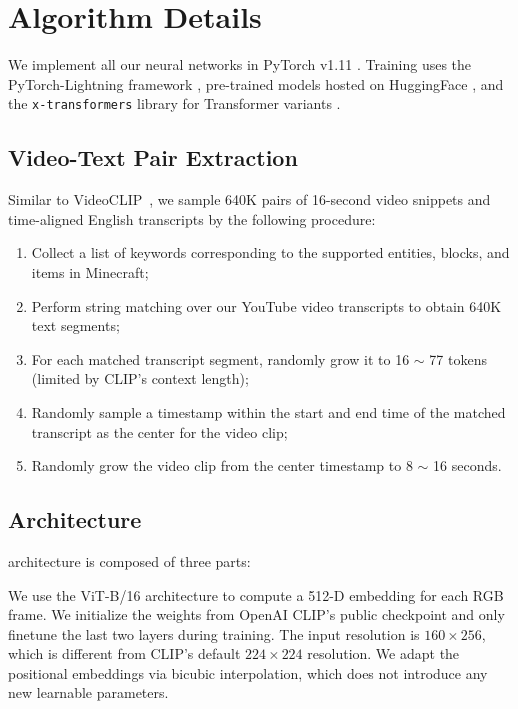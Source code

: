 \section{\mineclip Algorithm Details}
\label{supp:sec:mineclip}

We implement all our neural networks in PyTorch v1.11 \cite{paszke2019pytorch}. Training \mineclip uses the PyTorch-Lightning framework \cite{falcon2019pytorchlightning}, pre-trained models hosted on HuggingFace \cite{wolf2019huggingfaces}, and the \texttt{x-transformers} library for Transformer variants \cite{wang2021xtransformers}.

\subsection{Video-Text Pair Extraction}

Similar to VideoCLIP~\cite{xu2021videoclip}, we sample 640K pairs of 16-second video snippets and time-aligned English transcripts by the following procedure:

\begin{enumerate}[label=\arabic*)]
    \item Collect a list of keywords corresponding to the supported entities, blocks, and items in Minecraft;
    \item Perform string matching over our YouTube video transcripts to obtain 640K text segments;
    \item For each matched transcript segment, randomly grow it to 16 $\sim$ 77 tokens (limited by CLIP's context length);
    \item Randomly sample a timestamp within the start and end time of the matched transcript as the center for the video clip;
    \item Randomly grow the video clip from the center timestamp to 8 $\sim$ 16 seconds. 
\end{enumerate}


\subsection{Architecture} 
\mineclip architecture is composed of three parts:

 We use the ViT-B/16 architecture \cite{dosovitskiy2020image} to compute a 512-D embedding for each RGB frame. We initialize the weights from OpenAI CLIP's public checkpoint \cite{radford2021clip} and only finetune the last two layers during training. The input resolution is  $160 \times 256$, which is different from CLIP's default $224 \times 224$ resolution. We adapt the positional embeddings via bicubic interpolation, which does not introduce any new learnable parameters. 

